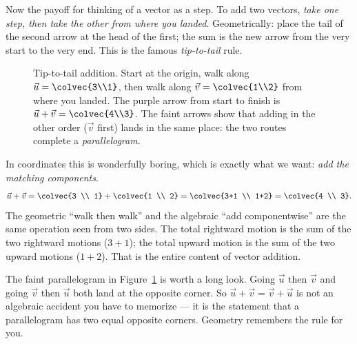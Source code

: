Now the payoff for thinking of a vector as a step. To add two vectors, \emph{take one
step, then take the other from where you landed}. Geometrically: place the tail of the
second arrow at the head of the first; the sum is the new arrow from the very start to
the very end. This is the famous \emph{tip-to-tail} rule.

\begin{figure}[H]
\centering
{}
\caption{Tip-to-tail addition. Start at the origin, walk along $\vec{u}=\colvec{3\\1}$,
then walk along $\vec{v}=\colvec{1\\2}$ from where you landed. The purple arrow from
start to finish is $\vec{u}+\vec{v}=\colvec{4\\3}$. The faint arrows show that adding in
the other order ($\vec{v}$ first) lands in the same place: the two routes complete a
\emph{parallelogram}.}
\label{ch02:fig-add}
\end{figure}

In coordinates this is wonderfully boring, which is exactly what we want: \emph{add the
matching components}.
\[
  \vec{u}+\vec{v}
  = \colvec{3 \\ 1} + \colvec{1 \\ 2}
  = \colvec{3+1 \\ 1+2}
  = \colvec{4 \\ 3}.
\]
The geometric ``walk then walk'' and the algebraic ``add componentwise'' are the same
operation seen from two sides. The total rightward motion is the sum of the two rightward
motions ($3+1$); the total upward motion is the sum of the two upward motions ($1+2$).
That is the entire content of vector addition.

\begin{intuitionbox}
The faint parallelogram in Figure~\ref{ch02:fig-add} is worth a long look. Going
$\vec{u}$ then $\vec{v}$ and going $\vec{v}$ then $\vec{u}$ both land at the opposite
corner. So $\vec{u}+\vec{v}=\vec{v}+\vec{u}$ is not an algebraic accident you have to
memorize --- it is the statement that a parallelogram has two equal opposite corners.
Geometry remembers the rule for you.
\end{intuitionbox}

